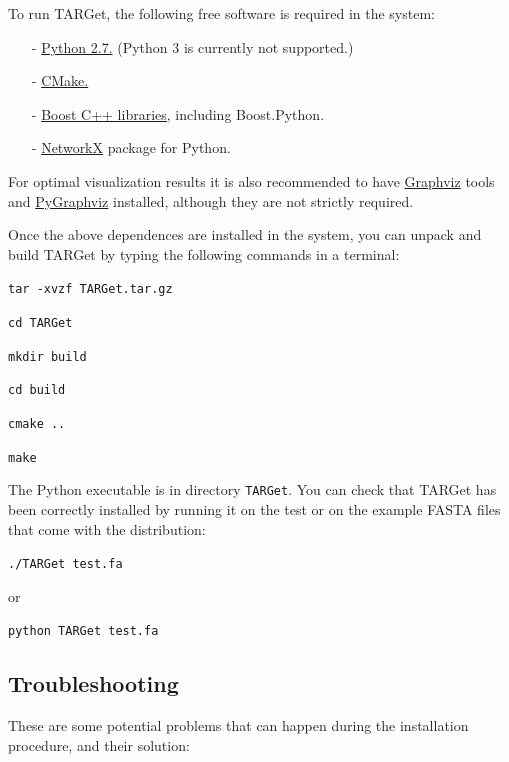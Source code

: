 \documentclass[12pt]{article}
\begin{document}
To run TARGet, the following free software is required in the system:
\begin{itemize}
\item[-] \href{https://www.python.org/}{Python 2.7.} (Python 3 is currently not supported.)
\item[-] \href{http://www.cmake.org/}{CMake.}
\item[-] \href{http://www.boost.org/}{Boost C++ libraries,} including Boost.Python.
\item[-] \href{https://networkx.github.io/}{NetworkX} package for Python.
\end{itemize}

\noindent For optimal visualization results it is also recommended to have \href{http://www.graphviz.org/}{Graphviz} tools and \href{http://pygraphviz.github.io/}{PyGraphviz} installed, although they are not strictly required.

Once the above dependences are installed in the system, you can unpack and build TARGet by typing the following commands in a terminal:

\texttt{tar -xvzf TARGet.tar.gz}

\texttt{cd TARGet}

\texttt{mkdir build}

\texttt{cd build}

\texttt{cmake ..}

\texttt{make}

The Python executable is in directory \texttt{TARGet}. You can check that TARGet has been correctly installed by running it on the test or on the example FASTA files that come with the distribution:

\texttt{./TARGet test.fa}

\noindent or

\texttt{python TARGet test.fa}


\subsection*{Troubleshooting}

These are some potential problems that can happen during the installation procedure, and their solution:
\end{document}
